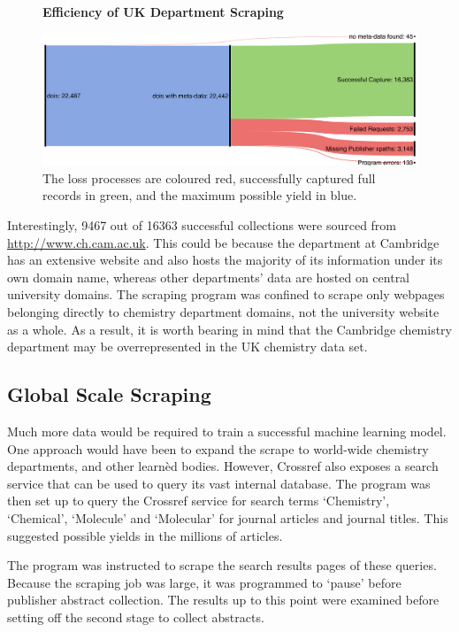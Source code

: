 \begin{figure}[H]
    \centering
    \textbf{Efficiency of UK Department Scraping}\par\medskip
    \includegraphics[width=\textwidth]{Data_Acquisition/uk_sankey.png}
    \caption[Efficiency of UK Department Scraping]{The loss processes are coloured red, successfully captured full records in green, and the maximum possible yield in blue.}
     \label{fig:UKSANK}
\end{figure}

Interestingly, 9467 out of 16363 successful collections were sourced from \url{http://www.ch.cam.ac.uk}. This could be because the department at Cambridge has an extensive website and also hosts the majority of its information under its own domain name, whereas other departments' data are hosted on central university domains. The scraping program was confined to scrape only webpages belonging directly to chemistry department domains, not the university website as a whole. As a result, it is worth bearing in mind that the Cambridge chemistry department may be overrepresented in the UK chemistry data set.

\subsection{Global Scale Scraping}
\label{sec:CROSSREFSCRAPE}
Much more data would be required to train a successful machine learning model. One approach would have been to expand the scrape to world-wide chemistry departments, and other learn\`{e}d bodies. However, Crossref also exposes a search service that can be used to query its vast internal database. The program was then set up to query the Crossref service for search terms `Chemistry', `Chemical', `Molecule' and `Molecular' for journal articles and journal titles. This suggested possible yields in the millions of articles. 

The program was instructed to scrape the search results pages of these queries. Because the scraping job was large, it was programmed to `pause' before publisher abstract collection. The results up to this point were examined before setting off the second stage to collect abstracts.

